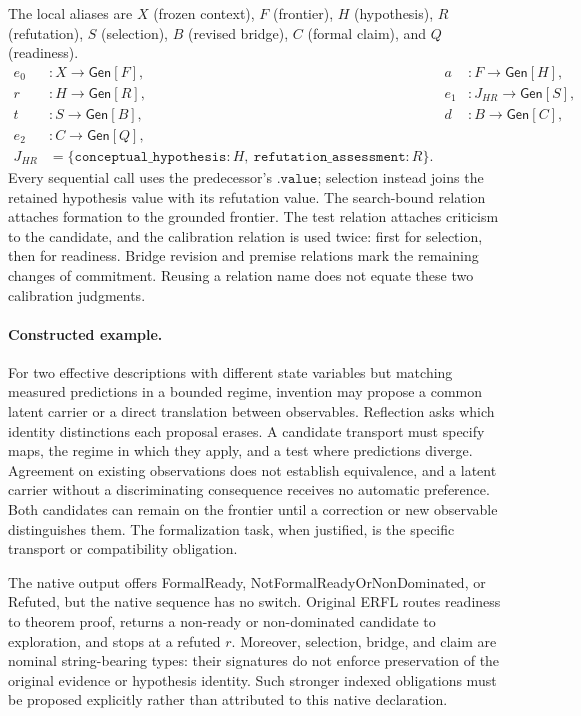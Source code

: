 The local aliases are $X$ (frozen context), $F$ (frontier), $H$ (hypothesis),
$R$ (refutation), $S$ (selection), $B$ (revised bridge), $C$ (formal claim), and
$Q$ (readiness).
\[
\begin{aligned}
 e_0 &:X\to\mathsf{Gen}[F],&a &:F\to\mathsf{Gen}[H],\\
 r &:H\to\mathsf{Gen}[R],&e_1 &:J_{HR}\to\mathsf{Gen}[S],\\
 t &:S\to\mathsf{Gen}[B],&d &:B\to\mathsf{Gen}[C],\\
 e_2 &:C\to\mathsf{Gen}[Q],\\
 J_{HR}&=\{\mathtt{conceptual\_hypothesis}:H,
           \ \mathtt{refutation\_assessment}:R\}.
\end{aligned}
\]
Every sequential call uses the predecessor's $\mathtt{.value}$; selection instead
joins the retained hypothesis value with its refutation value. The search-bound
relation attaches formation to the grounded frontier. The test relation attaches
criticism to the candidate, and the calibration relation is used twice: first
for selection, then for readiness. Bridge revision and premise relations mark
the remaining changes of commitment. Reusing a relation name does not equate
these two calibration judgments.

\paragraph{Constructed example.}
For two effective descriptions with different state variables but matching
measured predictions in a bounded regime, invention may propose a common latent
carrier or a direct translation between observables. Reflection asks which
identity distinctions each proposal erases. A candidate transport must specify
maps, the regime in which they apply, and a test where predictions diverge.
Agreement on existing observations does not establish equivalence, and a latent
carrier without a discriminating consequence receives no automatic preference.
Both candidates can remain on the frontier until a correction or new observable
distinguishes them. The formalization task, when justified, is the specific
transport or compatibility obligation.

The native output offers FormalReady, NotFormalReadyOrNonDominated, or Refuted,
but the native sequence has no switch. Original ERFL routes readiness to theorem
proof, returns a non-ready or non-dominated candidate to exploration, and stops
at a refuted $r$. Moreover, selection, bridge, and claim are nominal string-bearing
types: their signatures do not enforce preservation of the original evidence or
hypothesis identity. Such stronger indexed obligations must be proposed
explicitly rather than attributed to this native declaration.

